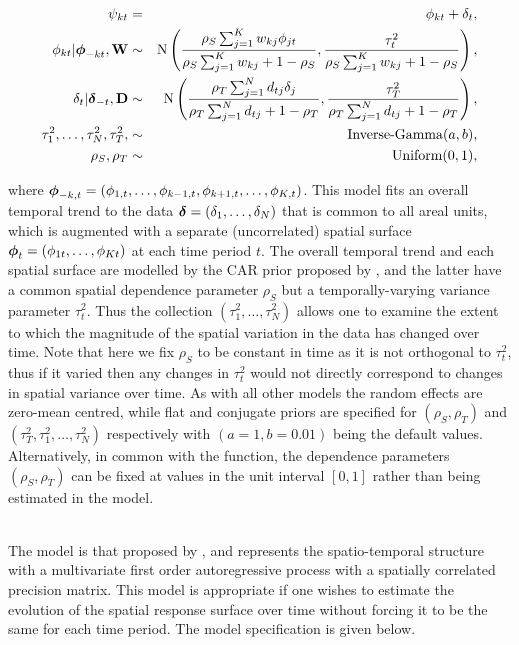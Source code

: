 \documentclass[article, nojss]{jss}
\newcommand{\bd}[1]{\ensuremath{\mbox{\boldmath $#1$}}}
\begin{document}
\begin{eqnarray}
\psi_{kt}&=&\phi_{kt} +  \delta_t,\label{carsepspat}\\
\phi_{kt}|\bd{\phi}_{-kt},\mathbf{W}&\sim&\mbox{N}\left(\frac{\rho_{S}\sum_{j=1}^Kw_{kj}\phi_{jt}}{\rho_{S}\sum_{j=1}^Kw_{kj} + 1-\rho_{S}}, \frac{\tau^2_{t}}{\rho_{S}\sum_{j=1}^Kw_{kj} + 1-\rho_{S}}\right),\nonumber\\
\delta_t|\bd{\delta}_{-t},\mathbf{D}&\sim&\mbox{N}\left(\frac{\rho_{T}\sum_{j=1}^N d_{tj}\delta_j}{\rho_{T}\sum_{j=1}^N d_{tj} + 1-\rho_{T}}, \frac{\tau^2_{T}}{\rho_{T}\sum_{j=1}^N d_{tj}+1-\rho_{T}}\right),\nonumber\\
\tau^2_{1},\ldots, \tau^2_{N}, \tau^2_{T}, &\sim&\mbox{Inverse-Gamma}(a,b),\nonumber\\
\rho_{S}, \rho_{T}&\sim&\mbox{Uniform}(0,1),\nonumber
\end{eqnarray}

where $\bd{\phi}_{-k,t}=(\phi_{1,t},\ldots,\phi_{k-1,t}, \phi_{k+1,t},\ldots,\phi_{K,t})$. This model fits an overall temporal trend to the data $\bd{\delta}=(\delta_1,\ldots,\delta_{N})$ that is common to all areal units, which is augmented with a separate (uncorrelated) spatial surface $\bd{\phi}_t=(\phi_{1t},\ldots, \phi_{Kt})$ at each time period $t$. The overall temporal trend and each spatial surface are modelled by the CAR prior proposed by \cite{leroux2000}, and the latter have a common spatial dependence parameter $\rho_S$ but a temporally-varying variance parameter $\tau^2_{t}$. Thus the collection $(\tau^2_{1},\ldots, \tau^2_{N})$ allows one to examine the extent to which the magnitude of the spatial variation in the data has changed over time. Note that here we fix $\rho_S$ to be constant in time as it is not orthogonal to $\tau^{2}_t$, thus if it varied then any changes in $\tau^{2}_t$ would not directly correspond to changes in spatial variance over time. As with all other models the random effects are zero-mean centred, while flat and conjugate priors are specified for $(\rho_S, \rho_T)$ and $(\tau^2_{T}, \tau^2_{1},\ldots, \tau^2_{N})$ respectively with $(a=1, b=0.01)$ being the default values. Alternatively, in common with the  function, the  dependence parameters $(\rho_{S}, \rho_{T})$ can be fixed at values in the unit interval $[0,1]$ rather than being estimated in the model.\vspace{1cm}




\\
The model is that proposed by \cite{rushworth2014}, and represents the spatio-temporal structure with a multivariate first order autoregressive process with a spatially correlated precision matrix. This model is appropriate if one wishes to estimate the  evolution of the spatial response surface over time without forcing it to be the same for each time period. The model specification is given below.
\end{document}
